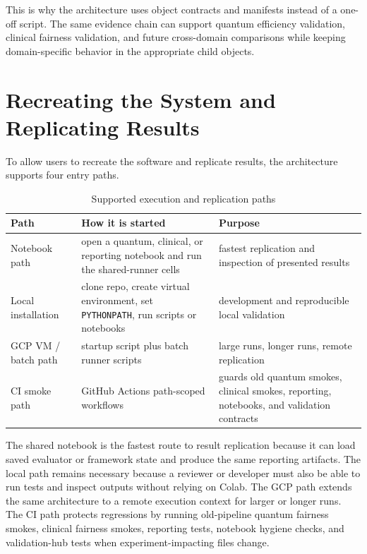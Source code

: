 \documentclass{IEEEtran}
\begin{document}
This is why the architecture uses object contracts and manifests instead of a one-off script. The same evidence chain can support quantum efficiency validation, clinical fairness validation, and future cross-domain comparisons while keeping domain-specific behavior in the appropriate child objects.

\section{Recreating the System and Replicating Results}
To allow users to recreate the software and replicate results, the architecture supports four entry paths.

\begin{table}[ht!]
\centering
\caption{Supported execution and replication paths}
\label{tab:paths}
\begin{tabular}{p{1.8cm}p{2.8cm}p{2.7cm}}
\toprule
\textbf{Path} & \textbf{How it is started} & \textbf{Purpose} \\
\midrule
Notebook path & open a quantum, clinical, or reporting notebook and run the shared-runner cells & fastest replication and inspection of presented results \\
Local installation & clone repo, create virtual environment, set \texttt{PYTHONPATH}, run scripts or notebooks & development and reproducible local validation \\
GCP VM / batch path & startup script plus batch runner scripts & large runs, longer runs, remote replication \\
CI smoke path & GitHub Actions path-scoped workflows & guards old quantum smokes, clinical smokes, reporting, notebooks, and validation contracts \\
\bottomrule
\end{tabular}
\end{table}

The shared notebook is the fastest route to result replication because it can load saved evaluator or framework state and produce the same reporting artifacts. The local path remains necessary because a reviewer or developer must also be able to run tests and inspect outputs without relying on Colab. The GCP path extends the same architecture to a remote execution context for larger or longer runs. The CI path protects regressions by running old-pipeline quantum fairness smokes, clinical fairness smokes, reporting tests, notebook hygiene checks, and validation-hub tests when experiment-impacting files change.
\end{document}
